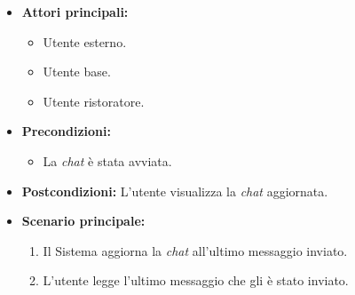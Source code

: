 \label{usecase:Lettura chat}
\begin{itemize}
	\item \textbf{Attori principali:} 
	\begin{itemize}
        \item Utente esterno.
        \item Utente base.
        \item Utente ristoratore.
    \end{itemize}

	\item \textbf{Precondizioni:}
	\begin{itemize}
        \item La \textit{chat} è stata avviata.
    \end{itemize}

	\item \textbf{Postcondizioni:} L'utente visualizza la \textit{chat} aggiornata.

	\item \textbf{Scenario principale:}
            \begin{enumerate}
                \item Il Sistema aggiorna la \textit{chat} all'ultimo messaggio inviato.
                \item L'utente legge l'ultimo messaggio che gli è stato inviato.
	      \end{enumerate}
\end{itemize}